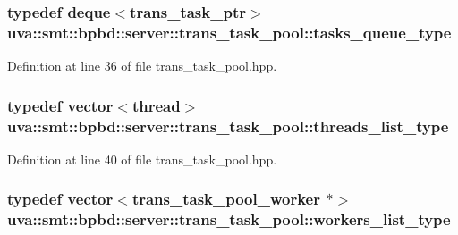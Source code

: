 \subsubsection[{tasks\+\_\+queue\+\_\+type}]{\setlength{\rightskip}{0pt plus 5cm}typedef deque$<${\bf trans\+\_\+task\+\_\+ptr}$>$ {\bf uva\+::smt\+::bpbd\+::server\+::trans\+\_\+task\+\_\+pool\+::tasks\+\_\+queue\+\_\+type}}\label{classuva_1_1smt_1_1bpbd_1_1server_1_1trans__task__pool_a854d6c3235224e2b976ab92b450461eb}


Definition at line 36 of file trans\+\_\+task\+\_\+pool.\+hpp.

\hypertarget{classuva_1_1smt_1_1bpbd_1_1server_1_1trans__task__pool_a0e3629aa32806e575a5690f7cbc78980}{}
\subsubsection[{threads\+\_\+list\+\_\+type}]{\setlength{\rightskip}{0pt plus 5cm}typedef vector$<$thread$>$ {\bf uva\+::smt\+::bpbd\+::server\+::trans\+\_\+task\+\_\+pool\+::threads\+\_\+list\+\_\+type}}\label{classuva_1_1smt_1_1bpbd_1_1server_1_1trans__task__pool_a0e3629aa32806e575a5690f7cbc78980}


Definition at line 40 of file trans\+\_\+task\+\_\+pool.\+hpp.

\hypertarget{classuva_1_1smt_1_1bpbd_1_1server_1_1trans__task__pool_added329421092deb379f0a52935ab18b}{}
\subsubsection[{workers\+\_\+list\+\_\+type}]{\setlength{\rightskip}{0pt plus 5cm}typedef vector$<${\bf trans\+\_\+task\+\_\+pool\+\_\+worker} $\ast$$>$ {\bf uva\+::smt\+::bpbd\+::server\+::trans\+\_\+task\+\_\+pool\+::workers\+\_\+list\+\_\+type}}\label{classuva_1_1smt_1_1bpbd_1_1server_1_1trans__task__pool_added329421092deb379f0a52935ab18b}


